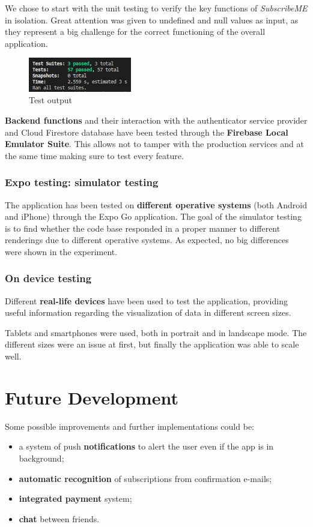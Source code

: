 \documentclass[12pt]{article}
\begin{document}
We chose to start with the unit testing to verify the key functions of \textit{SubscribeME} in isolation. Great attention was given to undefined and null values as input, as they represent a big challenge for the correct functioning of the overall application.

\begin{figure}[h!]
    \begin{center}
        \includegraphics[width=0.4\textwidth, clip]{../../assets/test.png}
    \end{center}
    \caption{Test output}
    \label{fig:test}
\end{figure}

\textbf{Backend functions} and their interaction with the authenticator service provider and Cloud Firestore database have been tested through the \textbf{Firebase Local Emulator Suite}. This allows not to tamper with the production services and at the same time making sure to test every feature.

\subsubsection{Expo testing: simulator testing}
The application has been tested on \textbf{different operative systems} (both Android and iPhone) through the Expo Go application. The goal of the simulator testing is to find whether the code base responded in a proper manner to different renderings due to different operative systems. As expected, no big differences were shown in the experiment.

\subsubsection{On device testing}
Different \textbf{real-life devices} have been used to test the application, providing useful information regarding the visualization of data in different screen sizes.

Tablets and smartphones were used, both in portrait and in landscape mode. The different sizes were an issue at first, but finally the application was able to scale well.

\section{Future Development}\label{sec:dev}
Some possible improvements and further implementations could be:
\begin{itemize}
    \item a system of push \textbf{notifications} to alert the user even if the app is in background;
    \item \textbf{automatic recognition} of subscriptions from confirmation e-mails;
    \item \textbf{integrated payment} system;
    \item \textbf{chat} between friends.
\end{itemize}
\end{document}
